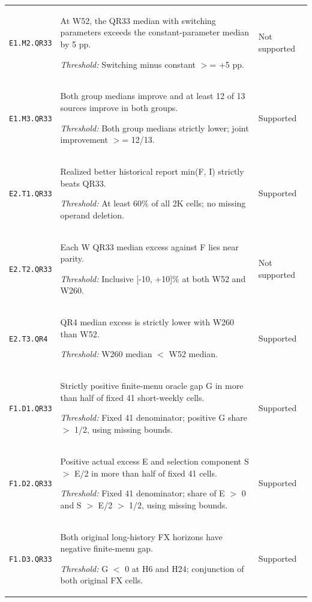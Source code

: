 \documentclass[10pt,a4paper]{article}
\begin{document}
{\begin{longtable}{p{2.0cm}p{10.5cm}p{2.5cm}}
\texttt{E1.\allowbreak{}M2.\allowbreak{}QR33} & At W52, the QR33 median with switching parameters exceeds the constant-parameter median by 5 pp.\par\emph{Threshold:} Switching minus constant \ensuremath{>}=\allowbreak{} +5 pp. & Not supported \\[3pt]
\texttt{E1.\allowbreak{}M3.\allowbreak{}QR33} & Both group medians improve and at least 12 of 13 sources improve in both groups.\par\emph{Threshold:} Both group medians strictly lower; joint improvement \ensuremath{>}=\allowbreak{} 12/\allowbreak{}13. & Supported \\[3pt]
\texttt{E2.\allowbreak{}T1.\allowbreak{}QR33} & Realized better historical report min(F,\allowbreak{} I) strictly beats QR33.\par\emph{Threshold:} At least 60\% of all 2K cells; no missing operand deletion. & Supported \\[3pt]
\texttt{E2.\allowbreak{}T2.\allowbreak{}QR33} & Each W QR33 median excess against F lies near parity.\par\emph{Threshold:} Inclusive [-10,\allowbreak{} +10]\% at both W52 and W260. & Not supported \\[3pt]
\texttt{E2.\allowbreak{}T3.\allowbreak{}QR4} & QR4 median excess is strictly lower with W260 than W52.\par\emph{Threshold:} W260 median \ensuremath{<} W52 median. & Supported \\[3pt]
\texttt{F1.\allowbreak{}D1.\allowbreak{}QR33} & Strictly positive finite-menu oracle gap G in more than half of fixed 41 short-weekly cells.\par\emph{Threshold:} Fixed 41 denominator; positive G share \ensuremath{>} 1/\allowbreak{}2,\allowbreak{} using missing bounds. & Supported \\[3pt]
\texttt{F1.\allowbreak{}D2.\allowbreak{}QR33} & Positive actual excess E and selection component S \ensuremath{>} E/\allowbreak{}2 in more than half of fixed 41 cells.\par\emph{Threshold:} Fixed 41 denominator; share of E \ensuremath{>} 0 and S \ensuremath{>} E/\allowbreak{}2 \ensuremath{>} 1/\allowbreak{}2,\allowbreak{} using missing bounds. & Supported \\[3pt]
\texttt{F1.\allowbreak{}D3.\allowbreak{}QR33} & Both original long-history FX horizons have negative finite-menu gap.\par\emph{Threshold:} G \ensuremath{<} 0 at H6 and H24; conjunction of both original FX cells. & Supported \\[3pt]

\end{longtable}}
\end{document}
